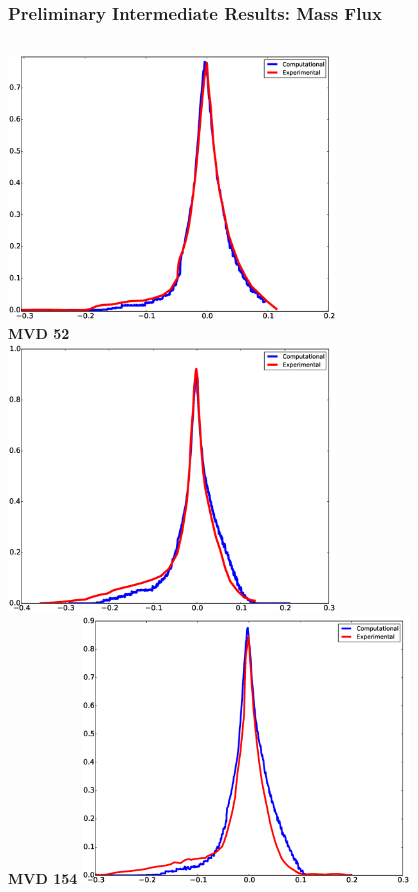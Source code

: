 \documentclass[9pt]{beamer}
\begin{document}
\begin{frame}
\frametitle{Preliminary Intermediate Results: Mass Flux}
\label{sec-5-7}


\begin{columns}[c]
    \centering
    \includegraphics[width=0.65\textwidth]{MVD52} \\
    {\bf MVD 52} \\
    \includegraphics[width=0.65\textwidth]{MVD154} \\
    {\bf MVD 154}
    \centering
    \includegraphics[width=0.65\textwidth]{MVD111} \\

\end{columns}
\end{frame}
\end{document}
